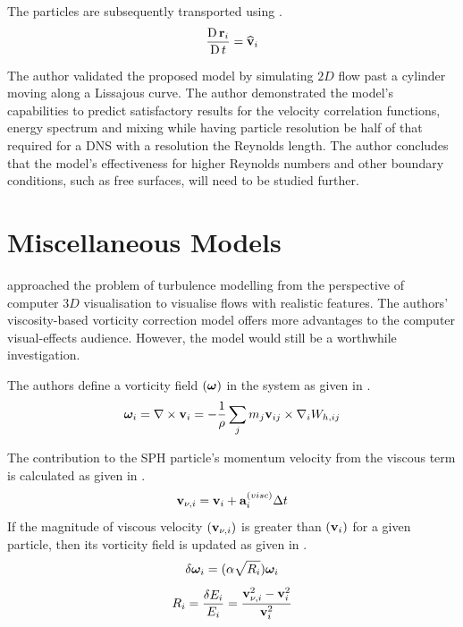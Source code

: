 The particles are subsequently transported using .
\begin{equation}
    \frac{\operatorname{D} \mathbf{r}_i}{\operatorname{D} t} = \widehat{\mathbf{v}}_i
    \label{eq:Monaghan2017-r-transport}
\end{equation}

The author validated the proposed model by simulating $2D$ flow past a cylinder moving along a Lissajous curve.
The author demonstrated the model’s capabilities to predict satisfactory results for the velocity correlation functions, energy spectrum and mixing while having particle resolution be half of that required for a DNS with a resolution the Reynolds length. The author concludes that the model’s effectiveness for higher Reynolds numbers and other boundary conditions, such as free surfaces, will need to be studied further.

\section{Miscellaneous Models}
\cite{Liu2019} approached the problem of turbulence modelling from the perspective of computer $3D$ visualisation to visualise flows with realistic features. The authors’ viscosity-based vorticity correction model offers more advantages to the computer visual-effects audience. However, the model would still be a worthwhile investigation.

The authors define a vorticity field $(\bm{\omega})$ in the system as given in .
\begin{equation}
    \bm{\omega}_i = \nabla \times \mathbf{v}_i = - \frac{1}{\rho} \sum_j m_j \mathbf{v}_{ij} \times \nabla_{i} W_{h, ij}
    \label{eq:Liu2019-vorticity}
\end{equation}

The contribution to the SPH particle’s momentum velocity from the viscous term is calculated as given in .
\begin{equation}
    \mathbf{v}_{\nu, i} = \mathbf{v}_i + \mathbf{a}_i^{(visc)}\Delta t
    \label{eq:Liu2019-visc-vel-contribution}
\end{equation}
If the magnitude of viscous velocity $(\mathbf{v}_{\nu, i})$ is greater than $(\mathbf{v}_i)$ for a given particle, then its vorticity field is updated as given in .
\begin{equation}
    \delta \bm{\omega}_i = (\alpha \sqrt{R_i}) \bm{\omega}_i
    \label{eq:Liu2019-vorticity-update}
\end{equation}
\begin{equation}
    R_i = \frac{\delta E_i}{E_i} = \frac{\mathbf{v}_{\nu, i}^2 - \mathbf{v}_i^2}{\mathbf{v}_i^2}
    \label{eg:Liu2019-R}
\end{equation}


